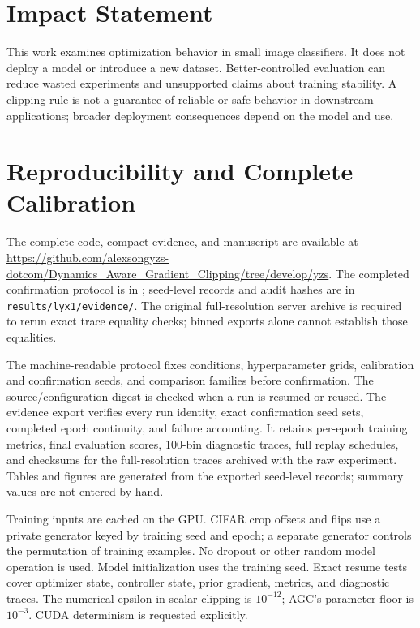 \documentclass{article}
\begin{document}
\section*{Impact Statement}
This work examines optimization behavior in small image classifiers. It does
not deploy a model or introduce a new dataset. Better-controlled evaluation
can reduce wasted experiments and unsupported claims about training stability.
A clipping rule is not a guarantee of reliable or safe behavior in downstream
applications; broader deployment consequences depend on the model and use.

\clearpage


\clearpage
\onecolumn
\appendix
\setlength{\intextsep}{8pt}

\section{Reproducibility and Complete Calibration}
The complete code, compact evidence, and manuscript are available at
\url{https://github.com/alexsongyzs-dotcom/Dynamics_Aware_Gradient_Clipping/tree/develop/yzs}.
The completed confirmation protocol is in \texttt{};
seed-level records and audit hashes are in \texttt{results/lyx1/evidence/}.
The original full-resolution server archive is required to rerun exact trace
equality checks; binned exports alone cannot establish those equalities.

The machine-readable protocol fixes conditions, hyperparameter grids,
calibration and confirmation seeds, and comparison families before confirmation.
The source/configuration digest is checked when a run is resumed or reused.
The evidence export verifies every run identity, exact confirmation seed sets,
completed epoch continuity, and failure accounting. It retains per-epoch
training metrics, final evaluation scores, 100-bin diagnostic traces, full
replay schedules, and checksums for the full-resolution traces archived with
the raw experiment. Tables and figures are generated from the exported
seed-level records; summary values are not entered by hand.

Training inputs are cached on the GPU. CIFAR crop offsets and flips use a
private generator keyed by training seed and epoch; a separate generator
controls the permutation of training examples. No dropout or other random
model operation is used. Model initialization uses the training seed. Exact
resume tests cover optimizer state, controller state, prior gradient, metrics,
and diagnostic traces. The numerical epsilon in scalar clipping is $10^{-12}$;
AGC's parameter floor is $10^{-3}$. CUDA determinism is requested explicitly.
\end{document}
